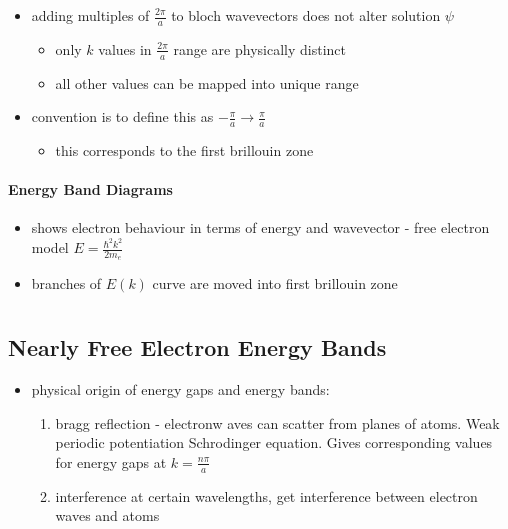\documentclass[a4paper,11pt,normalem]{article}
\begin{document}
\begin{itemize}
    \item adding multiples of \(\frac{2\pi}{a}\) to bloch wavevectors does not alter solution \(\psi\)
        \begin{itemize}
            \item only \(k\) values in \(\frac{2\pi}{a}\) range are physically distinct
            \item all other values can be mapped into unique range
        \end{itemize}
    \item convention is to define this as \(-\frac{\pi}{a} \to \frac{\pi}{a}\)
        \begin{itemize}
            \item this corresponds to the first brillouin zone
        \end{itemize}
\end{itemize}

\paragraph{Energy Band Diagrams}

\begin{itemize}
    \item shows electron behaviour in terms of energy and wavevector - free electron model \(E = \frac{\hbar^2k^2}{2m_e}\)
    \item branches of \(E(k)\) curve are moved into first brillouin zone
\end{itemize}

\section{}

\subsection{Nearly Free Electron Energy Bands}

\begin{itemize}
    \item physical origin of energy gaps and energy bands:
        \begin{enumerate}
            \item bragg reflection - electronw aves can scatter from planes of atoms. Weak periodic potentiation Schrodinger equation. Gives corresponding values for energy gaps at \(k = \frac{n\pi}{a}\)
            \item interference at certain wavelengths, get interference between electron waves and atoms
        \end{enumerate}
\end{itemize}
\end{document}
